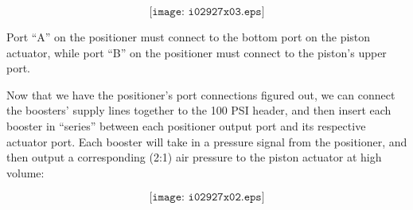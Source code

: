 $$\texttt{[image: i02927x03.eps]}$$

Port ``A'' on the positioner must connect to the bottom port on the piston actuator, while port ``B'' on the positioner must connect to the piston's upper port.

\filbreak

Now that we have the positioner's port connections figured out, we can connect the boosters' supply lines together to the 100 PSI header, and then insert each booster in ``series'' between each positioner output port and its respective actuator port.  Each booster will take in a pressure signal from the positioner, and then output a corresponding (2:1) air pressure to the piston actuator at high volume:

$$\texttt{[image: i02927x02.eps]}$$




